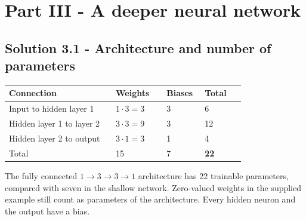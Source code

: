 \documentclass{course_sheet}
\begin{document}
\begin{center}


\end{center}

\section{Part III - A deeper neural network}

\subsection{Solution 3.1 - Architecture and number of parameters}

\begin{center}

\begingroup
\setlength{\tabcolsep}{3pt}
\begin{tabular}{@{}p{0.42\linewidth}p{0.20\linewidth}p{0.15\linewidth}p{0.166\linewidth}@{}}
\toprule
Connection & Weights & Biases & Total \\
\midrule
Input to hidden layer 1 & $1\cdot3=3$ & 3 & 6 \\
Hidden layer 1 to layer 2 & $3\cdot3=9$ & 3 & 12 \\
Hidden layer 2 to output & $3\cdot1=3$ & 1 & 4 \\
Total & 15 & 7 & \textbf{22} \\
\bottomrule
\end{tabular}
\endgroup

\end{center}

The fully connected $1\rightarrow3\rightarrow3\rightarrow1$ architecture
has 22 trainable parameters, compared with seven in the shallow network.
Zero-valued weights in the supplied example still count as parameters of
the architecture. Every hidden neuron and the output have a bias.
\end{document}
